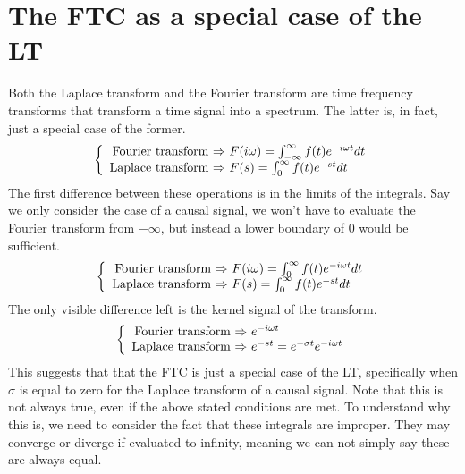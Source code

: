 \documentclass[]{subfiles}
\begin{document}
	\section{The FTC as a special case of the LT}
	Both  the  Laplace  transform  and  the  Fourier  transform  are  time  frequency  transforms that transform a time signal into a spectrum. The latter is, in fact, just a special case of the former. 
		\begin{equation}
		\left\{ \begin{array}{r@{\text{ $\Rightarrow$ }}l}
			\text{Fourier transform}& F(i\omega)= \int_{-\infty}^{\infty}f(t)e^{-i\omega t}dt \\
			\text{Laplace transform}&F(s)=\int_{0}^{\infty}f(t)e^{-st} dt
		\end{array}\right.
	\end{equation}
	The first difference between these operations is in the limits of the integrals. Say we only consider the case of a causal signal, we won't have to evaluate the Fourier transform from $-\infty$, but instead a lower boundary  of $0$ would be sufficient. 
			\begin{equation}
		\left\{ \begin{array}{r@{\text{ $\Rightarrow$ }}l}
			\text{Fourier transform}& F(i\omega)= \int_{0}^{\infty}f(t)e^{-i\omega t}dt \\
			\text{Laplace transform}&F(s)=\int_{0}^{\infty}f(t)e^{-st} dt
		\end{array}\right.
	\end{equation}
	The only visible difference left is the kernel signal of the transform. 
				\begin{equation}
		\left\{ \begin{array}{r@{\text{ $\Rightarrow$ }}l}
			\text{Fourier transform}& e^{-i\omega t} \\
			\text{Laplace transform}&e^{-st} = e^{-\sigma t} e^{-i\omega t}
		\end{array}\right.
	\end{equation}
	This suggests that that the FTC is just a special case of the LT, specifically when $\sigma$ is equal to zero for the Laplace transform of a causal signal. Note that this is not always true, even if the above stated conditions are met. To understand why this is, we need to consider the fact that these integrals are improper. They may converge or diverge if evaluated to infinity, meaning we can not simply say these are always equal.
\end{document}

